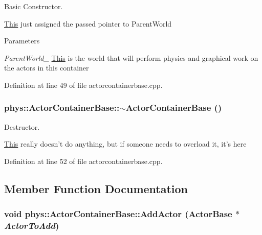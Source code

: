 Basic Constructor. 

\hyperlink{structThis}{This} just assigned the passed pointer to ParentWorld 
\begin{DoxyParams}{Parameters}
\item[{\em ParentWorld\_\-}]\hyperlink{structThis}{This} is the world that will perform physics and graphical work on the actors in this container \end{DoxyParams}


Definition at line 49 of file actorcontainerbase.cpp.

\hypertarget{classphys_1_1ActorContainerBase_aa5eac062dd70a220a4ec6df973c6f258}{
\subsubsection[{$\sim$ActorContainerBase}]{\setlength{\rightskip}{0pt plus 5cm}phys::ActorContainerBase::$\sim$ActorContainerBase ()}}
\label{d1/d00/classphys_1_1ActorContainerBase_aa5eac062dd70a220a4ec6df973c6f258}


Destructor. 

\hyperlink{structThis}{This} really doesn't do anything, but if someone needs to overload it, it's here 

Definition at line 52 of file actorcontainerbase.cpp.



\subsection{Member Function Documentation}
\hypertarget{classphys_1_1ActorContainerBase_af32c2adf4c0f928604ce05e20b07ef66}{
\subsubsection[{AddActor}]{\setlength{\rightskip}{0pt plus 5cm}void phys::ActorContainerBase::AddActor ({\bf ActorBase} $\ast$ {\em ActorToAdd})}}
\label{d1/d00/classphys_1_1ActorContainerBase_af32c2adf4c0f928604ce05e20b07ef66}


